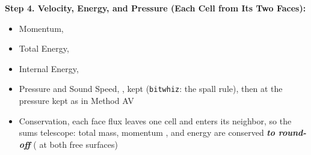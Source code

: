 \documentclass[11pt,addpoints]{exam}
\begin{document}
\begin{tcolorbox}[breakable]
\textbf{Step 4. Velocity, Energy, and Pressure (Each Cell from Its Two Faces):}\vspace{.5em}
\begin{itemize}
\item Momentum, \hspace{3mm} \vspace{.5em}
\item Total Energy, \hspace{3mm} \vspace{.5em}
\item Internal Energy, \hspace{3mm} \vspace{.5em}
\item Pressure and Sound Speed, \hspace{3mm} , \hspace{2mm} kept  (\texttt{bitwhiz}: the spall rule), \hspace{2mm} then  at the pressure kept \hspace{7mm} as in Method AV\vspace{.5em}
\item Conservation, \hspace{3mm} each face flux leaves one cell and enters its neighbor, so the sums telescope: total mass, momentum , and energy  are conserved \textbf{\emph{to round-off}} ( at both free surfaces)
\end{itemize}
\end{tcolorbox}

\clearpage
\end{document}
